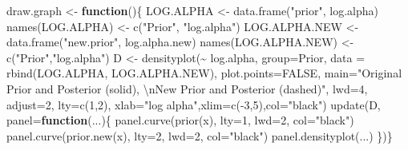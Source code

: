 \documentclass[
]{book}
\newenvironment{Shaded}{\begin{snugshade}}{\end{snugshade}}
\newcommand{\AttributeTok}[1]{\textcolor[rgb]{0.77,0.63,0.00}{#1}}
\newcommand{\ConstantTok}[1]{\textcolor[rgb]{0.00,0.00,0.00}{#1}}
\newcommand{\ControlFlowTok}[1]{\textcolor[rgb]{0.13,0.29,0.53}{\textbf{#1}}}
\newcommand{\DecValTok}[1]{\textcolor[rgb]{0.00,0.00,0.81}{#1}}
\newcommand{\FunctionTok}[1]{\textcolor[rgb]{0.00,0.00,0.00}{#1}}
\newcommand{\NormalTok}[1]{#1}
\newcommand{\OtherTok}[1]{\textcolor[rgb]{0.56,0.35,0.01}{#1}}
\newcommand{\SpecialCharTok}[1]{\textcolor[rgb]{0.00,0.00,0.00}{#1}}
\newcommand{\StringTok}[1]{\textcolor[rgb]{0.31,0.60,0.02}{#1}}
\begin{document}
\begin{Shaded}
\begin{Highlighting}[]
\NormalTok{draw.graph }\OtherTok{\textless{}{-}} \ControlFlowTok{function}\NormalTok{()\{}
\NormalTok{  LOG.ALPHA }\OtherTok{\textless{}{-}} \FunctionTok{data.frame}\NormalTok{(}\StringTok{"prior"}\NormalTok{, log.alpha)}
  \FunctionTok{names}\NormalTok{(LOG.ALPHA) }\OtherTok{\textless{}{-}} \FunctionTok{c}\NormalTok{(}\StringTok{"Prior"}\NormalTok{, }\StringTok{"log.alpha"}\NormalTok{)}
\NormalTok{  LOG.ALPHA.NEW }\OtherTok{\textless{}{-}} \FunctionTok{data.frame}\NormalTok{(}\StringTok{"new.prior"}\NormalTok{,}
\NormalTok{                              log.alpha.new)}
  \FunctionTok{names}\NormalTok{(LOG.ALPHA.NEW) }\OtherTok{\textless{}{-}} \FunctionTok{c}\NormalTok{(}\StringTok{"Prior"}\NormalTok{,}\StringTok{"log.alpha"}\NormalTok{)}
\NormalTok{  D }\OtherTok{\textless{}{-}} \FunctionTok{densityplot}\NormalTok{(}\SpecialCharTok{\textasciitilde{}}\NormalTok{ log.alpha,}
            \AttributeTok{group=}\NormalTok{Prior,}
            \AttributeTok{data =} \FunctionTok{rbind}\NormalTok{(LOG.ALPHA, LOG.ALPHA.NEW),}
            \AttributeTok{plot.points=}\ConstantTok{FALSE}\NormalTok{,}
        \AttributeTok{main=}\StringTok{"Original Prior and Posterior (solid), }\SpecialCharTok{\textbackslash{}n}\StringTok{New Prior and Posterior (dashed)"}\NormalTok{,}
        \AttributeTok{lwd=}\DecValTok{4}\NormalTok{, }\AttributeTok{adjust=}\DecValTok{2}\NormalTok{, }\AttributeTok{lty=}\FunctionTok{c}\NormalTok{(}\DecValTok{1}\NormalTok{,}\DecValTok{2}\NormalTok{),}
        \AttributeTok{xlab=}\StringTok{"log alpha"}\NormalTok{,}\AttributeTok{xlim=}\FunctionTok{c}\NormalTok{(}\SpecialCharTok{{-}}\DecValTok{3}\NormalTok{,}\DecValTok{5}\NormalTok{),}\AttributeTok{col=}\StringTok{"black"}\NormalTok{)}
    \FunctionTok{update}\NormalTok{(D, }\AttributeTok{panel=}\ControlFlowTok{function}\NormalTok{(...)\{}
      \FunctionTok{panel.curve}\NormalTok{(}\FunctionTok{prior}\NormalTok{(x), }\AttributeTok{lty=}\DecValTok{1}\NormalTok{, }\AttributeTok{lwd=}\DecValTok{2}\NormalTok{,}
                  \AttributeTok{col=}\StringTok{"black"}\NormalTok{)}
      \FunctionTok{panel.curve}\NormalTok{(}\FunctionTok{prior.new}\NormalTok{(x), }\AttributeTok{lty=}\DecValTok{2}\NormalTok{, }\AttributeTok{lwd=}\DecValTok{2}\NormalTok{,}
                  \AttributeTok{col=}\StringTok{"black"}\NormalTok{)}
    \FunctionTok{panel.densityplot}\NormalTok{(...)}
\NormalTok{\})\}}
\end{Highlighting}
\end{Shaded}
\end{document}
